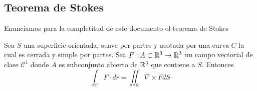 \documentclass[../main.tex]{subfiles}
\begin{document}
\subsection{Teorema de Stokes}
Enunciamos para la completitud de este documento el teorema de Stokes
\begin{teorema}[Stokes]
  Sea $S$ una superficie orientada, suave por partes y acotada por una curva $C$ la cual es cerrada y simple por partes.
  Sea $F: A \subset \mathbb{R}^{3} \to \mathbb{R}^{3}$ un campo vectorial de clase $\mathcal{C}^{1}$ donde $A$ es subconjunto abierto de $\mathbb{R}^{3}$ que contiene a $S$. Entonces
  \begin{equation*}
    \int_{C} F \cdot dr = \iint_{S} \nabla \times F dS
  \end{equation*}
\end{teorema}
\end{document}
